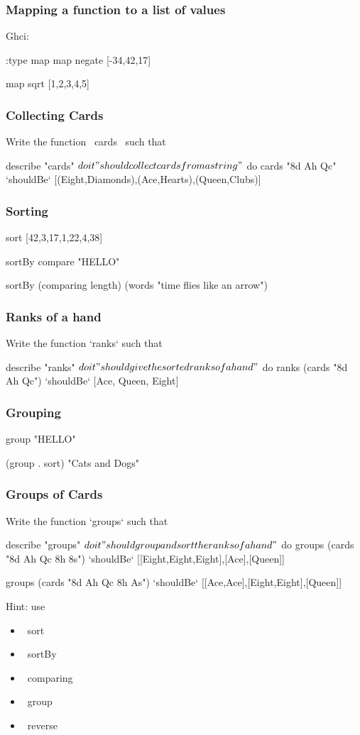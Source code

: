 \documentclass[11pt,xcolor={dvipsnames}]{beamer}
\newcommand{\tc}{\textcolor}
\newcommand{\key}[1]{\tc{orange}{#1}}
\newcommand{\rk}{\enskip{\key{$\hookleftarrow$}}}
\begin{document}
\begin{frame}[fragile]
\frametitle{Mapping a function to a list of values}
Ghci:
\begin{term}
:type map\rk
map negate [-34,42,17]\rk

map sqrt [1,2,3,4,5]\rk
\end{term}
\end{frame}
\begin{frame}[fragile]
\frametitle{Collecting Cards}
Write the function ~cards~ such that
\begin{hspec}
describe "cards" $ do
    it "should collect cards from a string" $ do
        cards "8d Ah Qc"  `shouldBe`
             [(Eight,Diamonds),(Ace,Hearts),(Queen,Clubs)]
\end{hspec}
\end{frame}
\begin{frame}[fragile]
\frametitle{Sorting}
\begin{term}
sort [42,3,17,1,22,4,38]\rk

sortBy compare "HELLO"\rk

sortBy (comparing length) (words "time flies like an arrow")\rk
\end{term}
\end{frame}
\begin{frame}[fragile]
\frametitle{Ranks of a hand}
Write the function `ranks` such that
\begin{hspec}
describe "ranks" $ do
    it "should give the sorted ranks of a hand" $ do
        ranks (cards "8d Ah Qc")  `shouldBe` [Ace, Queen, Eight]
\end{hspec}
\end{frame}
\begin{frame}[fragile]
\frametitle{Grouping}
\begin{term}
group "HELLO"\rk
    
(group . sort) "Cats and Dogs"\rk
\end{term}
\end{frame}
\begin{frame}[fragile]
\frametitle{Groups of Cards}
Write the function `groups` such that
\begin{hspec}
describe "groups" $ do
    it "should group and sort the ranks of a hand" $ do
        groups (cards "8d Ah Qc 8h 8s")  `shouldBe`
             [[Eight,Eight,Eight],[Ace],[Queen]]

        groups (cards "8d Ah Qc 8h As")  `shouldBe`
             [[Ace,Ace],[Eight,Eight],[Queen]]
\end{hspec}
Hint: use
\begin{itemize}
\item  ~sort~
\item  ~sortBy~
\item  ~comparing~
\item  ~group~
\item  ~reverse~
\end{itemize}
\end{frame}
\end{document}
